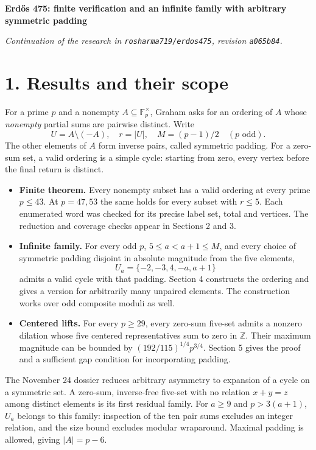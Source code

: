 \documentclass[11pt]{article}
\newcommand{\F}{\mathbb F}
\newcommand{\Z}{\mathbb Z}
\newcommand{\sect}[1]{\section*{\color{ink}#1}}
\begin{document}
{\Large\bfseries\color{ink} Erd\H{o}s 475: finite verification and an infinite family with arbitrary symmetric padding}\par
\smallskip
\textit{Continuation of the research in \texttt{rosharma719/erdos475}, revision \texttt{a065b84}.}
\sect{1. Results and their scope}
For a prime $p$ and a nonempty $A\subseteq\F_p^\times$, Graham asks for an ordering of $A$ whose \emph{nonempty} partial sums are pairwise distinct. Write
\[
 U=A\setminus(-A),\quad r=|U|,\quad M=(p-1)/2\quad(p\text{ odd}).
\]
The other elements of $A$ form inverse pairs, called symmetric padding. For a zero-sum set, a valid ordering is a simple cycle: starting from zero, every vertex before the final return is distinct.
\begin{itemize}
\item \textbf{Finite theorem.} Every nonempty subset has a valid ordering at every prime $p\le43$. At $p=47,53$ the same holds for every subset with $r\le5$. Each enumerated word was checked for its precise label set, total and vertices. The reduction and coverage checks appear in Sections 2 and 3.
\item \textbf{Infinite family.} For every odd $p$, $5\le a<a+1\le M$, and every choice of symmetric padding disjoint in absolute magnitude from the five elements,
\[
 U_a=\{-2,-3,4,-a,a+1\}
\]
admits a valid cycle with that padding. Section 4 constructs the ordering and gives a version for arbitrarily many unpaired elements. The construction works over odd composite moduli as well.
\item \textbf{Centered lifts.} For every $p\ge29$, every zero-sum five-set admits a nonzero dilation whose five centered representatives sum to zero in $\Z$. Their maximum magnitude can be bounded by $(192/115)^{1/4}p^{3/4}$. Section 5 gives the proof and a sufficient gap condition for incorporating padding.
\end{itemize}
The November 24 dossier reduces arbitrary asymmetry to expansion of a cycle on a symmetric set. A zero-sum, inverse-free five-set with no relation $x+y=z$ among distinct elements is its first residual family. For $a\ge9$ and $p>3(a+1)$, $U_a$ belongs to this family: inspection of the ten pair sums excludes an integer relation, and the size bound excludes modular wraparound. Maximal padding is allowed, giving $|A|=p-6$.
\end{document}
